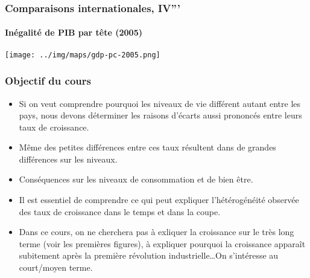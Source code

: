 \documentclass[10pt,notheorems]{beamer}
\theoremstyle{plain}
\theoremstyle{definition} %
\begin{document}
\begin{frame}
  \frametitle{Comparaisons internationales, IV'''}
  \framesubtitle{Inégalité de PIB par tête (2005)}

  \begin{center}
    \texttt{[image: ../img/maps/gdp-pc-2005.png]}
  \end{center}

\end{frame}


\begin{frame}
  \frametitle{Objectif du cours}

  \begin{itemize}

  \item Si on veut comprendre pourquoi les niveaux de vie différent
    autant entre les pays, nous devons déterminer les raisons d'écarts
    aussi prononcés entre leurs taux de croissance.\newline

  \item Même des petites différences entre ces taux résultent dans de
    grandes différences sur les niveaux.\newline

  \item Conséquences sur les niveaux de consommation et de bien être.\newline

  \item Il est essentiel de comprendre ce qui peut expliquer
    l'hétérogénéité observée des taux de croissance dans le temps et
    dans la coupe.\newline

  \item Dans ce cours, on ne cherchera pas à exliquer la croissance
    sur le très long terme (voir les premières figures), à expliquer
    pourquoi la croissance apparaît subitement après la première
    révolution industrielle\ldots On s'intéresse au court/moyen terme.

  \end{itemize}

\end{frame}
\end{document}
